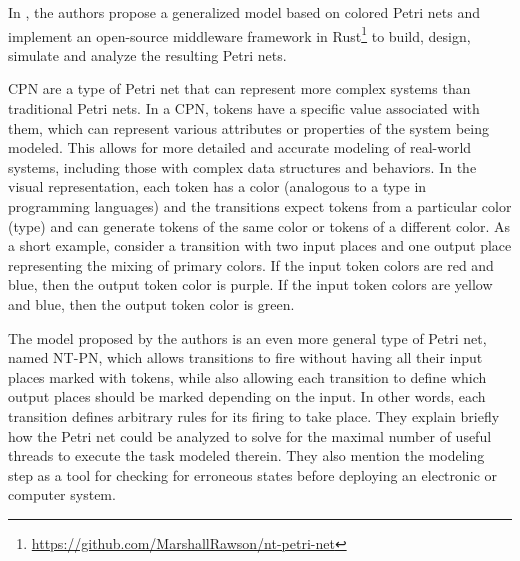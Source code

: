 \documentclass[../Thesis.tex]{subfiles}
\begin{document}
In \cite{rawson2022petri}, the authors propose a generalized model
based on colored Petri nets and implement an open-source middleware framework
in Rust\footnote{\url{https://github.com/MarshallRawson/nt-petri-net}}
to build, design, simulate and analyze the resulting Petri nets.

\acrfull{CPN} are a type of Petri net that can represent
more complex systems than traditional Petri nets.
In a CPN, tokens have a specific value associated with them,
which can represent various attributes or properties of the system being modeled.
This allows for more detailed and accurate modeling of real-world systems,
including those with complex data structures and behaviors.
In the visual representation, each token has a color
(analogous to a type in programming languages)
and the transitions expect tokens from a particular
color (type) and can generate tokens
of the same color or tokens of a different color.
As a short example, consider a transition
with two input places and one output place
representing the mixing of primary colors.
If the input token colors are red and blue, then the output token color is purple.
If the input token colors are yellow and blue, then the output token color is green.

The model proposed by the authors is an even more general type of Petri net,
named \acrfull{NT-PN}, which allows transitions to fire
without having all their input places marked with tokens,
while also allowing each transition to define
which output places should be marked depending on the input.
In other words, each transition defines arbitrary rules for its firing to take place.
They explain briefly how the Petri net could be analyzed
to solve for the maximal number of useful threads to execute the task modeled therein.
They also mention the modeling step as a tool for checking for erroneous states
before deploying an electronic or computer system.
\end{document}

